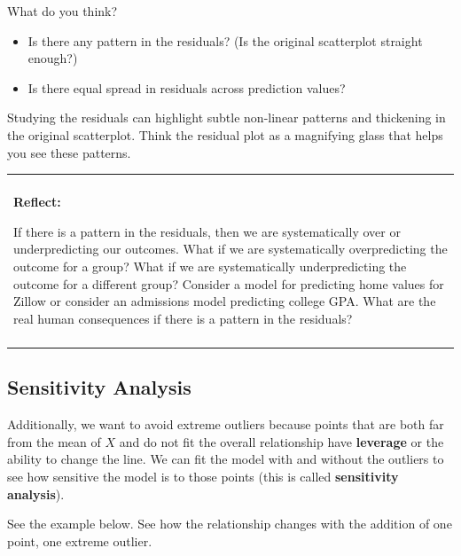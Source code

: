 \documentclass[
]{book}
\newenvironment{Shaded}{\begin{snugshade}}{\end{snugshade}}
\newcommand{\DataTypeTok}[1]{\textcolor[rgb]{0.13,0.29,0.53}{#1}}
\newcommand{\KeywordTok}[1]{\textcolor[rgb]{0.13,0.29,0.53}{\textbf{#1}}}
\newcommand{\NormalTok}[1]{#1}
\newcommand{\OperatorTok}[1]{\textcolor[rgb]{0.81,0.36,0.00}{\textbf{#1}}}
\newcommand{\OtherTok}[1]{\textcolor[rgb]{0.56,0.35,0.01}{#1}}
\newcommand{\StringTok}[1]{\textcolor[rgb]{0.31,0.60,0.02}{#1}}
\providecommand{\tightlist}{%
  \setlength{\itemsep}{0pt}\setlength{\parskip}{0pt}}
\newenvironment{reflect}
{
    \begin{center}
    
    \begin{tabular}{|p{0.8\textwidth}|}
    \rowcolor{LightBlue}
    \hline\\
    \rowcolor{LightBlue}
    \textbf{Reflect:}
}
{
    \\\rowcolor{LightBlue}
    \\\hline
    \end{tabular} 
    \end{center}
}
\begin{document}
What do you think?

\begin{itemize}
\tightlist
\item
  Is there any pattern in the residuals? (Is the original scatterplot straight enough?)
\item
  Is there equal spread in residuals across prediction values?
\end{itemize}

Studying the residuals can highlight subtle non-linear patterns and thickening in the original scatterplot. Think the residual plot as a magnifying glass that helps you see these patterns.

\begin{reflect}
If there is a pattern in the residuals, then we are systematically over
or underpredicting our outcomes. What if we are systematically
overpredicting the outcome for a group? What if we are systematically
underpredicting the outcome for a different group? Consider a model for
predicting home values for Zillow or consider an admissions model
predicting college GPA. What are the real human consequences if there is
a pattern in the residuals?
\end{reflect}

\hypertarget{sensitivity-analysis}{%
\subsection{Sensitivity Analysis}\label{sensitivity-analysis}}

Additionally, we want to avoid extreme outliers because points that are both far from the mean of \(X\) and do not fit the overall relationship have \textbf{leverage} or the ability to change the line. We can fit the model with and without the outliers to see how sensitive the model is to those points (this is called \textbf{sensitivity analysis}).

See the example below. See how the relationship changes with the addition of one point, one extreme outlier.

\begin{Shaded}
\end{Shaded}
\end{document}
